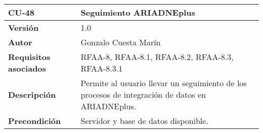 \begin{longtable}[]{@{}ll@{}}
\toprule
\begin{minipage}[b]{0.20\columnwidth}\raggedright
\textbf{CU-48}\strut
\end{minipage} & \begin{minipage}[b]{0.74\columnwidth}\raggedright
\textbf{Seguimiento ARIADNEplus}\strut
\end{minipage}\tabularnewline
\midrule
\endhead
\begin{minipage}[t]{0.20\columnwidth}\raggedright
\textbf{Versión}\strut
\end{minipage} & \begin{minipage}[t]{0.74\columnwidth}\raggedright
1.0\strut
\end{minipage}\tabularnewline
\begin{minipage}[t]{0.20\columnwidth}\raggedright
\textbf{Autor}\strut
\end{minipage} & \begin{minipage}[t]{0.74\columnwidth}\raggedright
Gonzalo Cuesta Marín\strut
\end{minipage}\tabularnewline
\begin{minipage}[t]{0.20\columnwidth}\raggedright
\textbf{Requisitos asociados}\strut
\end{minipage} & \begin{minipage}[t]{0.74\columnwidth}\raggedright
RFAA-8, RFAA-8.1, RFAA-8.2, RFAA-8.3, RFAA-8.3.1\strut
\end{minipage}\tabularnewline
\begin{minipage}[t]{0.20\columnwidth}\raggedright
\textbf{Descripción}\strut
\end{minipage} & \begin{minipage}[t]{0.74\columnwidth}\raggedright
Permite al usuario llevar un seguimiento de los procesos de integración
de datos en ARIADNEplus.\strut
\end{minipage}\tabularnewline
\begin{minipage}[t]{0.20\columnwidth}\raggedright
\textbf{Precondición}\strut
\end{minipage} & \begin{minipage}[t]{0.74\columnwidth}\raggedright
Servidor y base de datos disponible.


\end{minipage}
\end{longtable}
